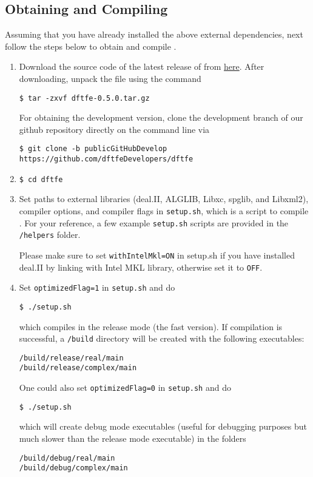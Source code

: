 \subsection{Obtaining and Compiling \dftfe{}}
Assuming that you have already installed the above external dependencies, next follow the steps below to obtain and compile \dftfe{}.
\begin{enumerate}
\item Download the source code of the latest release of \dftfe{} from \href{wesbite}{here}. After downloading, unpack the file using the command
\begin{verbatim}
$ tar -zxvf dftfe-0.5.0.tar.gz
\end{verbatim}
For obtaining the development version, clone the development branch of our github repository directly on the command line via
\begin{verbatim}
$ git clone -b publicGitHubDevelop https://github.com/dftfeDevelopers/dftfe
\end{verbatim}

\item   \begin{verbatim}
$ cd dftfe
\end{verbatim}


\item Set paths to external libraries (deal.II, ALGLIB, Libxc, spglib, and Libxml2), compiler options, and compiler flags in \verb|setup.sh|, which is a script to compile \dftfe{}. For your reference, a few example \verb|setup.sh| scripts are provided in the \verb|/helpers| folder. 
	
Please make sure to set \verb|withIntelMkl=ON| in setup.sh if you have installed deal.II by linking with Intel MKL library, otherwise set it to \verb|OFF|. 

\item Set \verb|optimizedFlag=1| in \verb|setup.sh| and do
\begin{verbatim}
$ ./setup.sh
\end{verbatim} 
which compiles \dftfe{} in the release mode (the fast version). If compilation is successful, a \verb|/build| directory will be created with the following executables:
\begin{verbatim}
/build/release/real/main
/build/release/complex/main
\end{verbatim}
One could also set \verb|optimizedFlag=0| in \verb|setup.sh| and do
\begin{verbatim}
$ ./setup.sh
\end{verbatim}
which will create debug mode executables (useful for debugging purposes but much slower than the release mode executable) in the folders
\begin{verbatim}
/build/debug/real/main
/build/debug/complex/main
\end{verbatim}
\end{enumerate}
